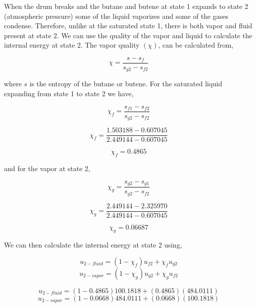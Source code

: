 \documentclass[10pt,parskip=half,
toc=sectionentrywithdots,
bibliography=totocnumbered,
captions=tableheading,numbers=noendperiod]{scrartcl}
\begin{document}
When the drum breaks and the butane and butene at state 1 expands to
state 2 (atmospheric pressure) some of the liquid vaporizes and some of
the gases condense. Therefore, unlike at the saturated state 1, there is
both vapor and fluid present at state 2. We can use the quality of the
vapor and liquid to calculate the internal energy at state 2. The vapor
quality \((\chi)\), can be calculated from,

\begin{equation}\chi = \frac{s - s_f}{s_{g2}-s_{f2}}\end{equation}

where \(s\) is the entropy of the butane or butene. For the saturated
liquid expanding from state 1 to state 2 we have,

\begin{equation}\chi_f = \frac{s_{f1} - s_{f2}}{s_{g2}-s_{f2}}\end{equation}

\begin{equation}\chi_f = \frac{1.503188 - 0.607045}{2.449144-0.607045}\end{equation}

\begin{equation}\chi_f = 0.4865\end{equation}

and for the vapor at state 2,

\begin{equation}\chi_g = \frac{s_{g2} - s_{g1}}{s_{g2}-s_{f2}}\end{equation}

\begin{equation}\chi_g= \frac{2.449144 - 2.325970}{2.449144-0.607045}\end{equation}

\begin{equation}\chi_g = 0.06687\end{equation}

We can then calculate the internal energy at state 2 using,

\begin{equation}u_{2-fluid} = (1-\chi_f)u_{f2} + \chi_f u_{g2}\end{equation}
\begin{equation}u_{2-vapor} = (1-\chi_g)u_{g2} + \chi_g u_{f2}\end{equation}

\begin{equation}u_{2-fluid} = (1-0.4865)100.1818 + (0.4865)(484.0111)\end{equation}
\begin{equation}u_{2-vapor} = (1-0.0668)484.0111 + (0.0668)(100.1818)\end{equation}
\end{document}
